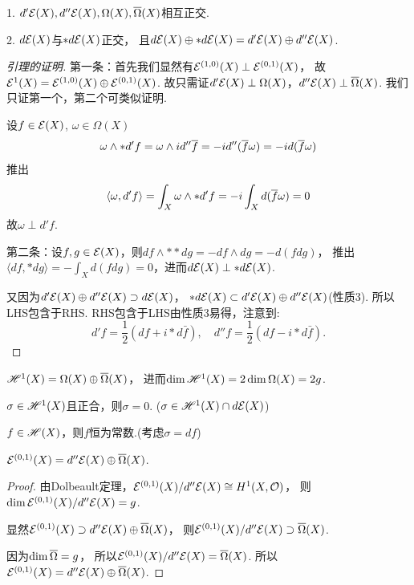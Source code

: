 \begin{lemma}
	1. $d'\mathcal{E}(X), d''\mathcal{E}(X), \Omega(X), \overline{\Omega}(X)$相互正交.

	2. $d\mathcal{E}(X)$与$*d\mathcal{E}(X)$正交，
    且$d\mathcal{E}(X)\oplus *d\mathcal{E}(X)=d'\mathcal{E}(X)\oplus d''\mathcal{E}(X)$.
\end{lemma}

\begin{proof}[引理的证明]
	第一条：首先我们显然有$\mathcal{E}^{(1,0)}(X) \perp \mathcal{E}^{(0,1)}(X)$，
    故$\mathcal{E}^1(X)=\mathcal{E}^{(1,0)}(X)\oplus \mathcal{E}^{(0,1)}(X)$. 
    故只需证$d'\mathcal{E}(X) \perp \Omega(X)$，$d''\mathcal{E}(X)\perp \overline{\Omega}(X)$. 我们只证第一个，第二个可类似证明.

	设$f\in \mathcal{E}(X)$, $\omega\in \Omega(X)$
	$$\omega \wedge *d'f=\omega \wedge id''\overline{f}
    =-id''(\overline{f}\omega)=-id(\overline{f}\omega)$$
	推出
	$$\langle \omega, d'f\rangle=\int_X \omega\wedge *d'f
    =-i\int_X d(\overline{f}\omega)=0$$
	故$\omega \perp d'f$.
			
	第二条：设$f,g\in \mathcal{E}(X)$，则$df\wedge **dg=-df\wedge dg=-d(fdg)$，
    推出$\langle df,*dg\rangle=-\int_X d(fdg)=0$，进而$d\mathcal{E}(X)\perp *d\mathcal{E}(X)$.

	又因为$d'\mathcal{E}(X)\oplus d''\mathcal{E}(X)\supset d\mathcal{E}(X)$，
    $*d\mathcal{E}(X)\subset d'\mathcal{E}(X)\oplus d''\mathcal{E}(X)$(性质3). 所以LHS包含于RHS.
	RHS包含于LHS由性质3易得，注意到:
    \[ d'f = \frac{1}{2}(df + i * d\bar{f}), \quad d''f = \frac{1}{2}(df - i * d\bar{f}). \]
\end{proof}

\begin{corollary}
	$\mathscr{H}^1(X)=\Omega(X)\oplus \overline{\Omega}(X)$，
    进而$\dim \mathscr{H}^1(X)=2\dim \Omega(X)=2g$.
\end{corollary}

\begin{corollary}
	$\sigma\in \mathscr{H}^1(X)$且正合，则$\sigma=0$.
    ($\sigma \in \mathscr{H}^1(X)\cap d\mathcal{E}(X)$)
\end{corollary}

\begin{corollary}
	$f\in \mathscr{H}(X)$，则$f$恒为常数.(考虑$\sigma=df$)
\end{corollary}

\begin{theorem}\label{decomposition}
	$\mathcal{E}^{(0,1)}(X)=d''\mathcal{E}(X)\oplus \overline{\Omega}(X)$.
\end{theorem}

\begin{proof}
	由Dolbeault定理，$\mathcal{E}^{(0,1)}(X)/d''\mathcal{E}(X)\cong H^1(X,\mathcal{O})$，
    则$\dim \mathcal{E}^{(0,1)}(X)/d''\mathcal{E}(X)=g$.

	显然$\mathcal{E}^{(0,1)}(X)\supset d''\mathcal{E}(X)\oplus \overline{\Omega}(X)$，
    则$\mathcal{E}^{(0,1)}(X)/d''\mathcal{E}(X)\supset \overline{\Omega}(X)$.

	因为$\dim \overline{\Omega}=g$，
    所以$\mathcal{E}^{(0,1)}(X)/d''\mathcal{E}(X)=\overline{\Omega}(X)$. 所以$\mathcal{E}^{(0,1)}(X)=d''\mathcal{E}(X)\oplus \overline{\Omega}(X)$.
\end{proof}

